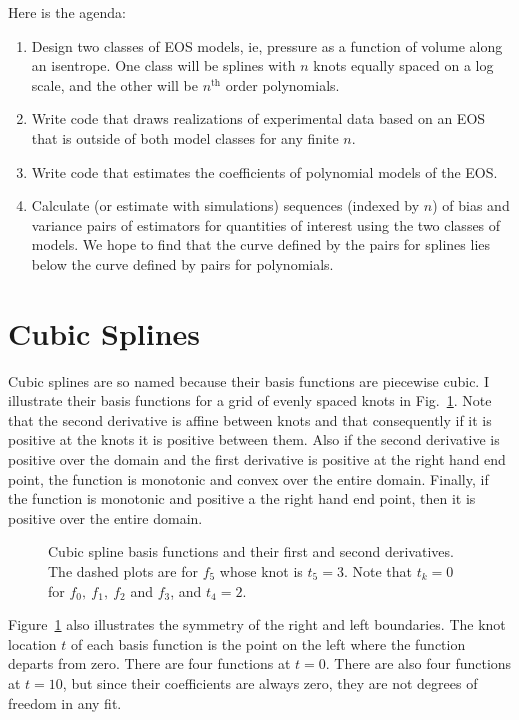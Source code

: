 \documentclass[11pt]{article}
\begin{document}
Here is the agenda:
\begin{enumerate}
\item Design two classes of EOS models, ie, pressure as a function of
  volume along an isentrope.  One class will be splines with $n$ knots
  equally spaced on a log scale, and the other will be $n^{\text{th}}$
  order polynomials.
\item Write code that draws realizations of experimental data based on
  an EOS that is outside of both model classes for any finite $n$.
\item Write code that estimates the coefficients of polynomial models
  of the EOS.
\item Calculate (or estimate with simulations) sequences (indexed by
  $n$) of bias and variance pairs of estimators for quantities of
  interest using the two classes of models.  We hope to find that the
  curve defined by the pairs for splines lies below the curve defined
  by pairs for polynomials.
\end{enumerate}

\appendix

\section{Cubic Splines}
\label{sec:splines}

Cubic splines are so named because their basis functions are piecewise
cubic.  I illustrate their basis functions for a grid of evenly spaced
knots in Fig.~\ref{fig:basis}.  Note that the second derivative is
affine between knots and that consequently if it is positive at the
knots it is positive between them.  Also if the second derivative is
positive over the domain and the first derivative is positive at the
right hand end point, the function is monotonic and convex over the
entire domain.  Finally, if the function is monotonic and positive a
the right hand end point, then it is positive over the entire domain.
\begin{figure}
  \centering
    \caption{Cubic spline basis functions and their first and second
      derivatives. The dashed plots are for $f_5$ whose knot is
      $t_5=3$.  Note that $t_k=0$ for $f_0,~f_1,~f_2$ and $f_3$, and
      $t_4=2$.}
  \label{fig:basis}
\end{figure}

Figure~\ref{fig:basis} also illustrates the symmetry of the right and
left boundaries.  The knot location $t$ of each basis function is the
point on the left where the function departs from zero.  There are
four functions at $t=0$.  There are also four functions at $t=10$, but
since their coefficients are always zero, they are not degrees of
freedom in any fit.
\end{document}

